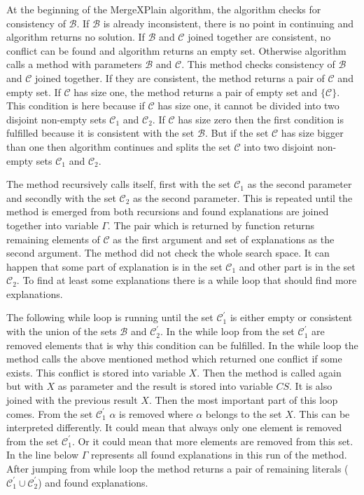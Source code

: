 \documentclass[12pt,a4paper]{article}
\begin{document}
At the beginning of the MergeXPlain algorithm, the algorithm checks for consistency of $\mathcal{B}$. If $\mathcal{B}$ is already inconsistent, there is no point in continuing and algorithm returns no solution. If $\mathcal{B}$ and $\mathcal{C}$ joined together are consistent, no conflict can be found and algorithm returns an empty set. Otherwise algorithm calls a method  with parameters $\mathcal{B}$ and $\mathcal{C}$. This method checks consistency of $\mathcal{B}$ and $\mathcal{C}$ joined together. If they are consistent, the method returns a pair of $\mathcal{C}$ and empty set. If $\mathcal{C}$ has size one, the method returns a pair of empty set and $\{ \mathcal{C} \}$. This condition is here because if $\mathcal{C}$ has size one, it cannot be divided into two disjoint non-empty sets $\mathcal{C}_{1}$ and $\mathcal{C}_{2}$. If $\mathcal{C}$ has size zero then the first condition is fulfilled because it is consistent with the set $\mathcal{B}$. But if the set $\mathcal{C}$ has size bigger than one then algorithm continues and splits the set $\mathcal{C}$ into two disjoint non-empty sets $\mathcal{C}_{1}$ and $\mathcal{C}_{2}$. 

The method recursively calls itself, first with the set $\mathcal{C}_{1}$ as the second parameter and secondly with the set $\mathcal{C}_{2}$ as the second parameter. This is repeated until the method is emerged from both recursions and found explanations are joined together into variable $\Gamma$. The pair which is returned by function  returns remaining elements of $\mathcal{C}$ as the first argument and set of explanations as the second argument. The method did not check the whole search space. It can happen that some part of explanation is in the set $\mathcal{C}_{1}$ and other part is in the set $\mathcal{C}_{2}$. To find at least some explanations there is a while loop that should find more explanations. 

The following while loop is running until the set $\mathcal{C}^{\prime}_{1}$ is either empty or consistent with the union of the sets $\mathcal{B}$ and $\mathcal{C}^{\prime}_{2}$. In the while loop from the set $\mathcal{C}^{\prime}_{1}$ are removed elements that is why this condition can be fulfilled. In the while loop the method calls the above mentioned method  which returned one conflict if some exists. This conflict is stored into variable $X$. Then the  method is called again but with $X$ as parameter and the result is stored into variable $CS$. It is also joined with the previous result $X$. Then the most important part of this loop comes. From the set $\mathcal{C}^{\prime}_{1}$ $\alpha$ is removed where $\alpha$ belongs to the set $X$. This can be interpreted differently. It could mean that always only one element is removed from the set $\mathcal{C}^{\prime}_{1}$. Or it could mean that more elements are removed from this set. In the line below $\Gamma$ represents all found explanations in this run of the method. After jumping from while loop the method returns a pair of remaining literals ($\mathcal{C}^{\prime}_{1} \cup \mathcal{C}^{\prime}_{2}$) and found explanations.
\end{document}
